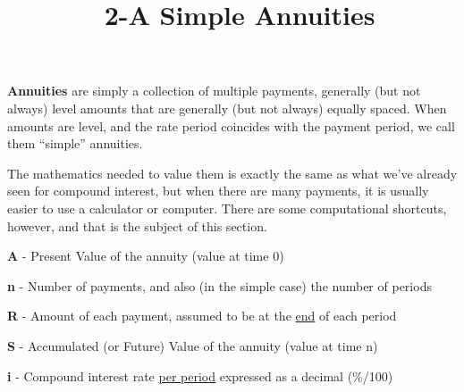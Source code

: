 \documentclass[12pt]{article}
\title{\normalfont\ 2-A Simple Annuities} %
\author{} %
\date{}  %
\begin{document}
\maketitle %

\vspace{-1.1in}

\begin{flushleft}
    \textbf{Annuities} are simply a collection of multiple payments, generally (but not always)
    level amounts that are generally (but not always) equally spaced.  When amounts are level, and
    the rate period coincides with the payment period, we call them ``simple'' annuities.
\end{flushleft}

\begin{flushleft}
    The mathematics needed to value them is exactly the same as what we've already seen for compound interest,
    but when there are many payments, it is usually easier to use a calculator or computer.  There are some
    computational shortcuts, however, and that is the subject of this section.
\end{flushleft}
\vspace{.05in}

\begin{description}
    \item\textbf{A} - Present Value of the annuity (value at time 0)
    \item\textbf{n} - Number of payments, and also (in the simple case) the number of periods
    \item \textbf{R} - Amount of each payment, assumed to be at the \underline{end} of each period
    \item\textbf{S} - Accumulated (or Future) Value of the annuity (value at time n)
    \item\textbf{i} - Compound interest rate \underline{per period} expressed as a decimal {(\%/100)}

\end{description}
\vspace{.1in}
\end{document}
